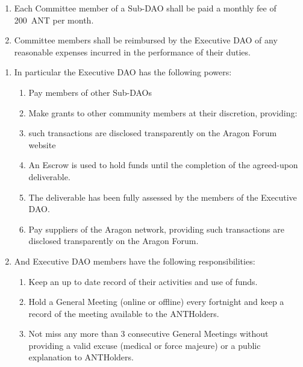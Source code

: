 \begin{enumerate}
\begin{enumerate}
		\begin{enumerate}
			\item Each Committee member of a Sub-\ac{DAO} shall be paid a monthly fee of 200~\ac{ANT} per month.
			\item Committee members shall be reimbursed by the Executive \ac{DAO} of any reasonable expenses incurred in the performance of their duties.
		\end{enumerate}
	
	\end{enumerate}
	
	\begin{enumerate}
		
		\begin{enumerate}
			
			\item In particular the Executive \ac{DAO} has the following powers:
			\begin{enumerate}
				\item Pay members of other Sub-\acp{DAO}
				\item Make grants to other community members at their discretion, providing:
				\item such transactions are disclosed transparently on the Aragon Forum website
				\item An Escrow is used to hold funds until the completion of the agreed-upon deliverable.
				\item The deliverable has been fully assessed by the members of the Executive \ac{DAO}.
				\item Pay suppliers of the Aragon network, providing such transactions are disclosed transparently on the Aragon Forum.
			\end{enumerate}
			
			\item And Executive \ac{DAO} members have the following responsibilities:
			\begin{enumerate}
				\item Keep an up to date record of their activities and use of funds.
				\item Hold a General Meeting (online or offline) every fortnight and keep a record of the meeting available to the \glspl{ANTHolder}.
				\item Not miss any more than 3 consecutive General Meetings without providing a valid excuse (medical or force majeure) or a public explanation to \glspl{ANTHolder}.
			\end{enumerate}


\end{enumerate}
\end{enumerate}
\end{enumerate}
